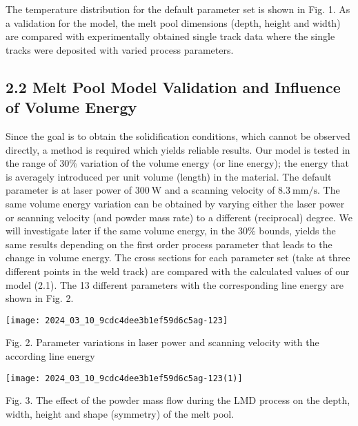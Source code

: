 \documentclass[10pt]{article}
\begin{document}
The temperature distribution for the default parameter set is shown in Fig. 1. As a validation for the model, the melt pool dimensions (depth, height and width) are compared with experimentally obtained single track data where the single tracks were deposited with varied process parameters.

\subsection*{2.2 Melt Pool Model Validation and Influence of Volume Energy}
Since the goal is to obtain the solidification conditions, which cannot be observed directly, a method is required which yields reliable results. Our model is tested in the range of $30 \%$ variation of the volume energy (or line energy); the energy that is averagely introduced per unit volume (length) in the material. The default parameter is at laser power of $300 \mathrm{~W}$ and a scanning velocity of $8.3 \mathrm{~mm} / \mathrm{s}$. The same volume energy variation can be obtained by varying either the laser power or scanning velocity (and powder mass rate) to a different (reciprocal) degree. We will investigate later if the same volume energy, in the $30 \%$ bounds, yields the same results depending on the first order process parameter that leads to the change in volume energy. The cross sections for each parameter set (take at three different points in the weld track) are compared with the calculated values of our model (2.1). The 13 different parameters with the corresponding line energy are shown in Fig. 2.

\begin{center}
\texttt{[image: 2024\_03\_10\_9cdc4dee3b1ef59d6c5ag-123]}
\end{center}

Fig. 2. Parameter variations in laser power and scanning velocity with the according line energy

\begin{center}
\texttt{[image: 2024\_03\_10\_9cdc4dee3b1ef59d6c5ag-123(1)]}
\end{center}

Fig. 3. The effect of the powder mass flow during the LMD process on the depth, width, height and shape (symmetry) of the melt pool.
\end{document}
